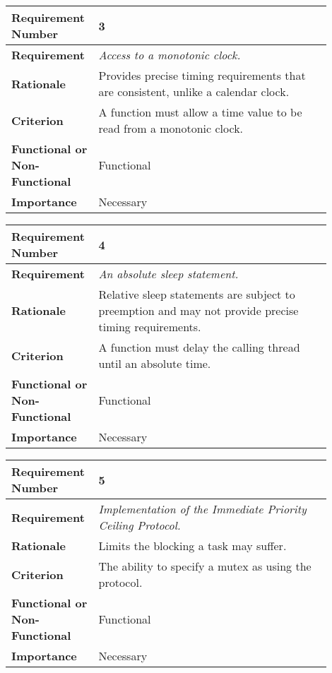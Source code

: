 \begin{table}[!h]
\centering
\begin{tabular}{|L{0.2\linewidth}|L{0.7\linewidth}|}
\hline
\textbf{Requirement Number} & 3 \\ \hline
\textbf{Requirement} & \emph{Access to a monotonic clock.} \\ \hline
\textbf{Rationale}      & Provides precise timing requirements 
                that are consistent, unlike a calendar clock. \\ \hline
\textbf{Criterion}      & A function must allow a time value to be read from a monotonic
                clock. \\ \hline
\textbf{Functional or Non-Functional} & Functional \\ \hline
\textbf{Importance}     & Necessary \\ \hline
\end{tabular}
\end{table}
\begin{table}[!h]
\centering
\begin{tabular}{|L{0.2\linewidth}|L{0.7\linewidth}|}
\hline
\textbf{Requirement Number} & 4 \\ \hline
\textbf{Requirement} & \emph{An absolute sleep statement.} \\ \hline
\textbf{Rationale}      & Relative sleep statements are subject to preemption and may not 
                provide precise timing requirements. \\ \hline
\textbf{Criterion}      & A function must delay the calling thread until an absolute time. \\ \hline
\textbf{Functional or Non-Functional} & Functional \\ \hline
\textbf{Importance}     & Necessary \\ \hline
\end{tabular}
\end{table}
\begin{table}[!h]
\centering
\begin{tabular}{|L{0.2\linewidth}|L{0.7\linewidth}|}
\hline
\textbf{Requirement Number} & 5 \\ \hline
\textbf{Requirement} & \emph{Implementation of the Immediate Priority Ceiling
Protocol.} \\ \hline
\textbf{Rationale}      & Limits the blocking a task may suffer.  \\ \hline
\textbf{Criterion}      & The ability to specify a mutex as using the protocol.\\ \hline
\textbf{Functional or Non-Functional} & Functional \\ \hline
\textbf{Importance}     & Necessary \\ \hline
\end{tabular}
\end{table}
